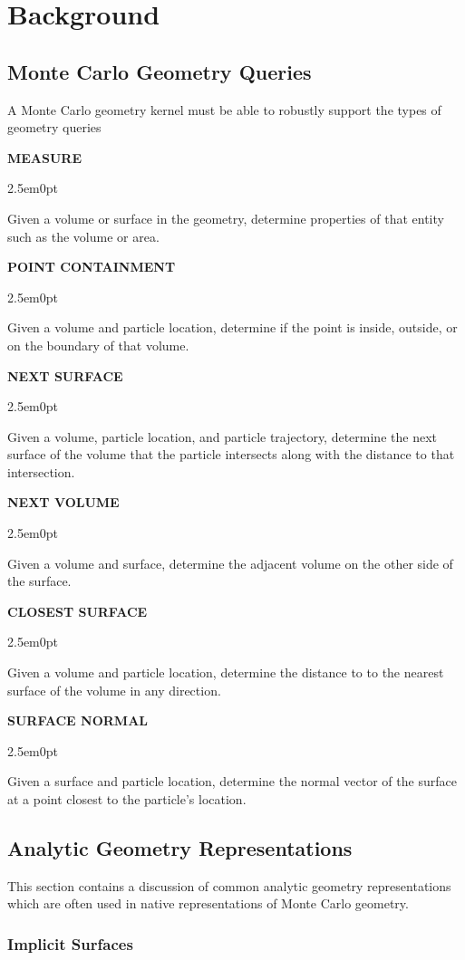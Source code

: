 \newcommand{\geomQuery}[2] {
  \null %
  \textbf{\uppercase{#1}} 
  \begin{adjustwidth}{2.5em}{0pt}
    #2
  \end{adjustwidth}
}

\chapter{Background}\label{ch:background}

\section{Monte Carlo Geometry Queries}

A Monte Carlo geometry kernel must be able to robustly support the types of
geometry queries


\geomQuery{Measure}{
    Given a volume or surface in the geometry, determine properties of that entity
  such as the volume or area.
}

\geomQuery{Point Containment}{
    Given a volume and particle location, determine if the point is inside,
    outside, or on the boundary of that volume.
}

\geomQuery{Next Surface}{
  Given a volume, particle location, and particle trajectory, determine the next
  surface of the volume that the particle intersects along with the distance to
  that intersection.
}

\geomQuery{Next Volume}{
  Given a volume and surface, determine the adjacent volume on the other side of
  the surface.
}

\geomQuery{Closest Surface}{
  Given a volume and particle location, determine the distance to to the nearest
  surface of the volume in any direction.
}


\geomQuery{Surface Normal}{
  Given a surface and particle location, determine the normal vector of the
  surface at a point closest to the particle's location.
}

\section{Analytic Geometry Representations}\label{sec:analytic_geometry}

This section contains a discussion of common analytic geometry  representations
which are often used in native representations of Monte Carlo geometry.

\subsection{Implicit Surfaces}\label{subsec:implicit_surfaces}


